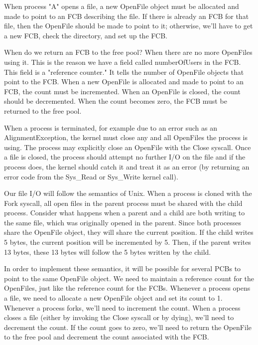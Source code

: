\documentclass[12pt]{article}
\begin{document}
When process "A" opens a file, a new OpenFile object must be allocated
and made to point to an FCB describing the file.  If there is already
an FCB for that file, then the OpenFile should be made to point to it;
otherwise, we'll have to get a new FCB, check the directory, and set
up the FCB.

When do we return an FCB to the free pool?  When there are no more
OpenFiles using it.  This is the reason we have a field called
numberOfUsers in the FCB.  This field is a "reference counter."  It
tells the number of OpenFile objects that point to the FCB.  When a
new OpenFile is allocated and made to point to an FCB, the count must
be incremented.  When an OpenFile is closed, the count should be
decremented.  When the count becomes zero, the FCB must be returned to
the free pool.

When a process is terminated, for example due to an error such as an
AlignmentException, the kernel must close any and all OpenFiles the
process is using.  The process may explicitly close an OpenFile with
the Close syscall.  Once a file is closed, the process should attempt
no further I/O on the file and if the process does, the kernel should
catch it and treat it as an error (by returning an error code from the
Sys\_Read or Sys\_Write kernel call).

Our file I/O will follow the semantics of Unix.  When a process is
cloned with the Fork syscall, all open files in the parent process
must be shared with the child process.  Consider what happens when a
parent and a child are both writing to the same file, which was
originally opened in the parent.  Since both processes share the
OpenFile object, they will share the current position.  If the child
writes 5 bytes, the current position will be incremented by 5.  Then,
if the parent writes 13 bytes, these 13 bytes will follow the 5 bytes
written by the child.

In order to implement these semantics, it will be possible for several
PCBs to point to the same OpenFile object.  We need to maintain a
reference count for the OpenFiles, just like the reference count for
the FCBs.  Whenever a process opens a file, we need to allocate a new
OpenFile object and set its count to 1.  Whenever a process forks,
we'll need to increment the count.  When a process closes a file
(either by invoking the Close syscall or by dying), we'll need to
decrement the count.  If the count goes to zero, we'll need to return
the OpenFile to the free pool and decrement the count associated with
the FCB.
\end{document}
